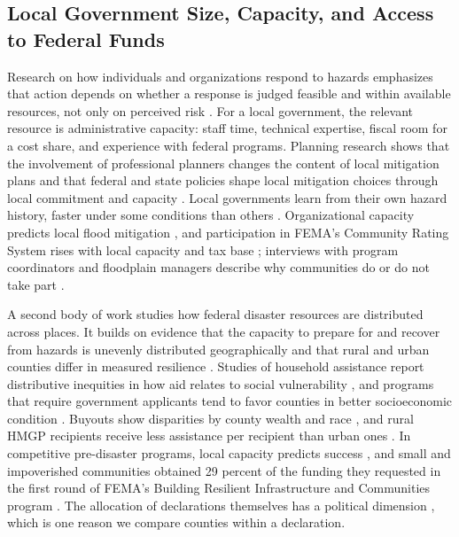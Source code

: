 \subsection{Local Government Size, Capacity, and Access to Federal Funds}
\label{sec:literature}

Research on how individuals and organizations respond to hazards emphasizes that action depends on whether a response is judged feasible and within available resources, not only on perceived risk \parencite{lindell2012padm,bubeck2012review}. For a local government, the relevant resource is administrative capacity: staff time, technical expertise, fiscal room for a cost share, and experience with federal programs. Planning research shows that the involvement of professional planners changes the content of local mitigation plans \parencite{lyles2014planners} and that federal and state policies shape local mitigation choices through local commitment and capacity \parencite{burby2006katrina,berke2014impacts}. Local governments learn from their own hazard history, faster under some conditions than others \parencite{brody2009policy}. Organizational capacity predicts local flood mitigation \parencite{brody2010identifying}, and participation in FEMA's Community Rating System rises with local capacity and tax base \parencite{posey2009determinants,sadiq2015local,li2018flood}; interviews with program coordinators and floodplain managers describe why communities do or do not take part \parencite{sadiq2020participation}.

A second body of work studies how federal disaster resources are distributed across places. It builds on evidence that the capacity to prepare for and recover from hazards is unevenly distributed geographically \parencite{cutter2003sovi,cutter2008temporal} and that rural and urban counties differ in measured resilience \parencite{cutter2016urbanrural}. Studies of household assistance report distributive inequities in how aid relates to social vulnerability \parencite{drakes2021social,emrich2022distributive}, and programs that require government applicants tend to favor counties in better socioeconomic condition \parencite{miao2025equity}. Buyouts show disparities by county wealth and race \parencite{mach2019buyouts,elliott2020racial}, and rural HMGP recipients receive less assistance per recipient than urban ones \parencite{seong2022naturally}. In competitive pre-disaster programs, local capacity predicts success \parencite{smith2025rural}, and small and impoverished communities obtained 29 percent of the funding they requested in the first round of FEMA's Building Resilient Infrastructure and Communities program \parencite{headwaters_nd}. The allocation of declarations themselves has a political dimension \parencite{garrett2003political,reeves2011political}, which is one reason we compare counties within a declaration.

